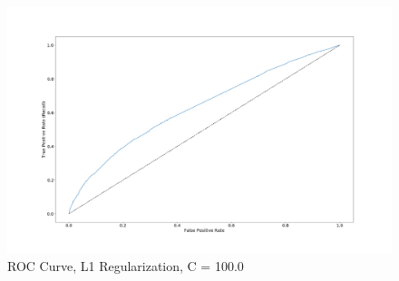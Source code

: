 \documentclass[sigconf]{acmart}
\begin{document}
\begin{figure}[!ht]
  \centering\includegraphics[width=\columnwidth]{images/roccurve100.png}
  \caption{ROC Curve, L1 Regularization, C = 100.0}\label{f:roccurve100}
\end{figure}

\appendix
\end{document}
